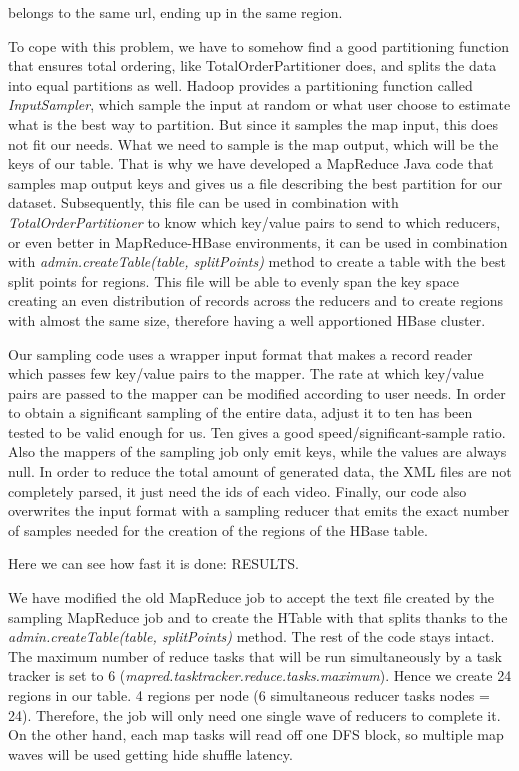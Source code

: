 belongs to the same url, ending up in the same region.
\par
To cope with this problem, we have to somehow find a good partitioning function that ensures total ordering, like TotalOrderPartitioner does, and splits the data into equal partitions as well. Hadoop provides a partitioning function called \textit{InputSampler}, which sample the input at random or what user choose to estimate what is the best way to partition. But since it samples the map input, this does not fit our needs. What we need to sample is the map output, which will be the keys of our table. That is why we have developed a MapReduce Java code that samples map output keys and gives us a file describing the best partition for our dataset. Subsequently, this file can be used in combination with \textit{TotalOrderPartitioner} to know which key/value pairs to send to which reducers, or even better in MapReduce-HBase environments, it can be used in combination with \textit{admin.createTable(table, splitPoints)} method to create a table with the best split points for regions. This file will be able to evenly span the key space creating an even distribution of records across the reducers and to create regions with almost the same size, therefore having a well apportioned HBase cluster.
\par
Our sampling code uses a wrapper input format that makes a record reader which passes few key/value pairs to the mapper. The rate at which key/value pairs are passed to the mapper can be modified according to user needs. In order to obtain a significant sampling of the entire data, adjust it to ten has been tested to be valid enough for us. Ten gives a good speed/significant-sample ratio. Also the mappers of the sampling job only emit keys, while the values are always null. In order to reduce the total amount of generated data, the XML files are not completely parsed, it just need the ids of each video. Finally, our code also overwrites the input format with a sampling reducer that emits the exact number of samples needed for the creation of the regions of the HBase table. 
\par
Here we can see how fast it is done: RESULTS.
\bigskip

We have modified the old MapReduce job to accept the text file created by the sampling MapReduce job and to create the HTable with that splits thanks to the \textit{admin.createTable(table, splitPoints)} method. The rest of the code stays intact.
\\
The maximum number of reduce tasks that will be run simultaneously by a task tracker is set to 6 (\textit{mapred.tasktracker.reduce.tasks.maximum}). Hence we create 24 regions in our table. 4 regions per node (6 simultaneous reducer tasks  nodes = 24). Therefore, the job will only need one single wave of reducers to complete it. On the other hand, each map tasks will read off one DFS block, so multiple map waves will be used getting hide shuffle latency.

